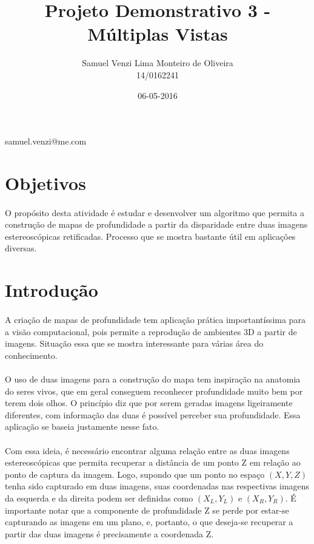 \documentclass[conference, harvard, brazil, english]{sbatex}
\begin{document}
\title{Projeto Demonstrativo 3 - Múltiplas Vistas}
\date{06-05-2016}
\author{Samuel Venzi Lima Monteiro de Oliveira\\14/0162241}{samuel.venzi@me.com}
\address{SQN 208\\Brasília\\Brasil}
	
	
	\section{Objetivos}
	\paragraph{}
		O propósito desta atividade é estudar e desenvolver um algoritmo que permita a construção de mapas de profundidade a partir da disparidade entre duas imagens estereoscópicas retificadas. Processo que se mostra bastante útil em aplicações diversas.
	\section{Introdução}
	\paragraph{}
		A criação de mapas de profundidade tem aplicação prática importantíssima para a visão computacional, pois permite a reprodução de ambientes 3D a partir de imagens. Situação essa que se mostra interessante para várias área do conhecimento.
	\paragraph{}
		O uso de duas imagens para a construção do mapa tem inspiração na anatomia do seres vivos, que em geral conseguem reconhecer profundidade muito bem por terem dois olhos. O princípio diz que por serem geradas imagens ligeiramente diferentes, com informação das duas é possível perceber sua profundidade. Essa aplicação se baseia justamente nesse fato.
	\paragraph{}
		Com essa ideia, é necessário encontrar alguma relação entre as duas imagens estereoscópicas que permita recuperar a distância de um ponto Z em relação ao ponto de captura da imagem. Logo, supondo que um ponto no espaço $ (X,Y,Z) $ tenha sido capturado em duas imagens, suas coordenadas nas respectivas imagens da esquerda e da direita podem ser definidas como $ (X_{L},Y_{L}) $ e $ (X_{R},Y_{R}) $. É importante notar que a componente de profundidade Z se perde por estar-se capturando as imagens em um plano, e, portanto, o que deseja-se recuperar a partir das duas imagens é precisamente a coordenada Z.
\end{document}
